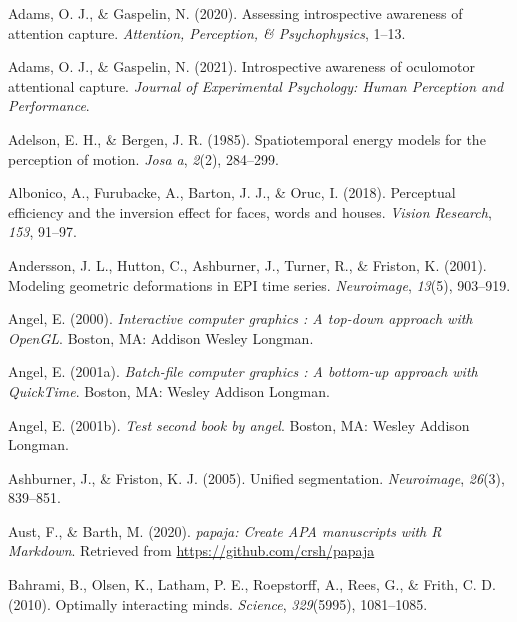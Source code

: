 \documentclass[12pt,twoside]{reedthesis}
\newenvironment{CSLReferences}%
  {}%
  {\par}
\begin{document}
\hypertarget{refs}{}
\begin{CSLReferences}{1}{0}
\leavevmode\hypertarget{ref-adams2020assessing}{}%
Adams, O. J., \& Gaspelin, N. (2020). Assessing introspective awareness of attention capture. \emph{Attention, Perception, \& Psychophysics}, 1--13.

\leavevmode\hypertarget{ref-adams2021introspective}{}%
Adams, O. J., \& Gaspelin, N. (2021). Introspective awareness of oculomotor attentional capture. \emph{Journal of Experimental Psychology: Human Perception and Performance}.

\leavevmode\hypertarget{ref-adelson1985spatiotemporal}{}%
Adelson, E. H., \& Bergen, J. R. (1985). Spatiotemporal energy models for the perception of motion. \emph{Josa a}, \emph{2}(2), 284--299.

\leavevmode\hypertarget{ref-albonico2018perceptual}{}%
Albonico, A., Furubacke, A., Barton, J. J., \& Oruc, I. (2018). Perceptual efficiency and the inversion effect for faces, words and houses. \emph{Vision Research}, \emph{153}, 91--97.

\leavevmode\hypertarget{ref-andersson2001modeling}{}%
Andersson, J. L., Hutton, C., Ashburner, J., Turner, R., \& Friston, K. (2001). Modeling geometric deformations in EPI time series. \emph{Neuroimage}, \emph{13}(5), 903--919.

\leavevmode\hypertarget{ref-angel2000}{}%
Angel, E. (2000). \emph{Interactive computer graphics : A top-down approach with OpenGL}. Boston, MA: Addison Wesley Longman.

\leavevmode\hypertarget{ref-angel2001}{}%
Angel, E. (2001a). \emph{Batch-file computer graphics : A bottom-up approach with QuickTime}. Boston, MA: Wesley Addison Longman.

\leavevmode\hypertarget{ref-angel2002a}{}%
Angel, E. (2001b). \emph{Test second book by angel}. Boston, MA: Wesley Addison Longman.

\leavevmode\hypertarget{ref-ashburner2005unified}{}%
Ashburner, J., \& Friston, K. J. (2005). Unified segmentation. \emph{Neuroimage}, \emph{26}(3), 839--851.

\leavevmode\hypertarget{ref-R-papaja}{}%
Aust, F., \& Barth, M. (2020). \emph{{papaja}: {Create} {APA} manuscripts with {R Markdown}}. Retrieved from \url{https://github.com/crsh/papaja}

\leavevmode\hypertarget{ref-bahrami2010optimally}{}%
Bahrami, B., Olsen, K., Latham, P. E., Roepstorff, A., Rees, G., \& Frith, C. D. (2010). Optimally interacting minds. \emph{Science}, \emph{329}(5995), 1081--1085.


\end{CSLReferences}
\end{document}
